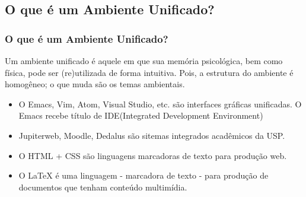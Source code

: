 \documentclass{beamer}
\begin{document}
\begin{frame}

  \section{O que é um Ambiente Unificado?}
  \frametitle{O que é um Ambiente Unificado?}
  \pause
  \begin{Definition}[Definição]
    Um \alert{ambiente unificado} é aquele em que sua memória psicológica, bem como
    física, pode ser (re)utilizada de forma intuitiva. Pois, a estrutura do ambiente é
    homogêneo; o que muda são os temas ambientais.
    \end{Definition}
    \pause

    \begin{example}[Exemplos]
      \begin{itemize}

      \item O Emacs, Vim, Atom, Visual Studio, etc. são interfaces gráficas unificadas. O
        Emacs recebe título de IDE(Integrated Development Environment)

        \pause

      \item Jupiterweb, Moodle, Dedalus são sitemas integrados acadêmicos da
        USP.
        \pause
      \item O HTML + CSS são linguagens marcadoras de texto para produção web.
        \pause
      \item O \alert{\LaTeX} é uma linguagem - marcadora de texto - para produção de documentos
        que tenham conteúdo multimídia.
      \end{itemize}
    \end{example}
\end{frame}
\end{document}
